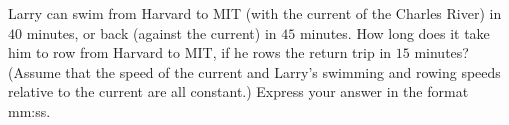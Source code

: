 Larry can swim from Harvard to MIT (with the current of the Charles River) in $40$ minutes, or back (against the current) in $45$ minutes. How long does it take him to row from Harvard to MIT, if he rows the return trip in $15$ minutes? (Assume that the speed of the current and Larry’s swimming and rowing speeds relative to the current are all constant.) Express your answer in the format mm:ss.